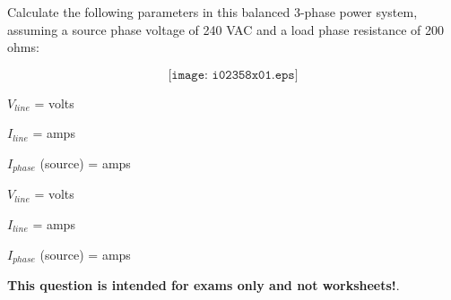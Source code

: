 

Calculate the following parameters in this balanced 3-phase power system, assuming a source phase voltage of 240 VAC and a load phase resistance of 200 ohms:

$$\texttt{[image: i02358x01.eps]}$$

$V_{line}$ = \underbar{\hskip 50pt} volts

\vskip 10pt

$I_{line}$ = \underbar{\hskip 50pt} amps

\vskip 10pt

$I_{phase}$ (source) = \underbar{\hskip 50pt} amps







$V_{line}$ =  volts

$I_{line}$ =  amps

$I_{phase}$ (source) =  amps







{\bf This question is intended for exams only and not worksheets!}.


